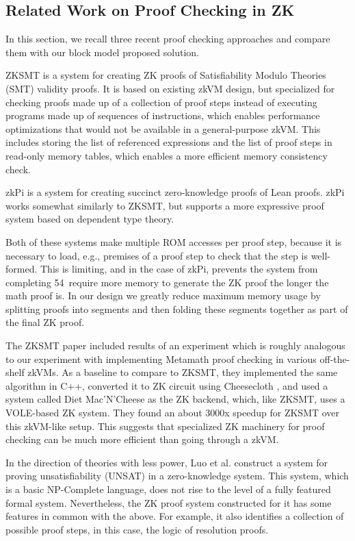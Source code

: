 \documentclass{article}
\theoremstyle{plain}
\theoremstyle{definition}
\begin{document}
\subsection{Related Work on Proof Checking in ZK}

In this section, we recall three recent proof checking approaches and compare them with our block model proposed solution.

ZKSMT \cite{zksmt} is a system for creating ZK proofs of Satisfiability Modulo Theories (SMT) validity proofs. It is based on existing zkVM design, but
specialized for checking proofs made up of a collection of proof steps instead of executing programs made up
of sequences of instructions, which enables performance optimizations that would not be available in a
general-purpose zkVM. This includes storing the list of referenced expressions and the list of proof steps in
read-only memory tables, which enables a more efficient memory consistency check.

zkPi \cite{zkpi} is a system for creating succinct zero-knowledge proofs of Lean proofs. zkPi works somewhat similarly to
ZKSMT, but supports a more expressive proof system based on dependent type theory.

Both of these systems make multiple ROM accesses per proof step, because it is necessary to load, e.g.,
premises of a proof step to check that the step is well-formed. This is limiting, and in the case of zkPi, prevents the system from completing 54\
require more memory to generate the ZK proof the longer the math proof is.
In our design we greatly reduce maximum memory usage by splitting proofs into 
segments and then folding these segments together as part of the final ZK proof.

The ZKSMT paper included results of an experiment which is roughly analogous to our experiment with implementing
Metamath proof checking in various off-the-shelf zkVMs. As a baseline to compare to ZKSMT, they implemented
the same algorithm in C++, converted it to ZK circuit using Cheesecloth
\cite{cuéllar2023cheeseclothzeroknowledgeproofsrealworld}, and used a system
called Diet Mac'N'Cheese as the ZK backend, which, like ZKSMT, uses a VOLE-based ZK system. They found an about 3000x
speedup for ZKSMT over this zkVM-like setup. This suggests that specialized ZK machinery for proof checking can be 
much more efficient than going through a zkVM.

In the direction of theories with less power, Luo et al. \cite{zkunsat} construct a system for proving unsatisfiability (UNSAT) in a zero-knowledge system. This system, which is a basic NP-Complete language, does not rise to the level of a fully featured formal system. Nevertheless, the ZK proof system constructed for it has some features in common with the above. For example, it also identifies a collection of possible proof steps, in this case, the logic of resolution proofs.
\end{document}
